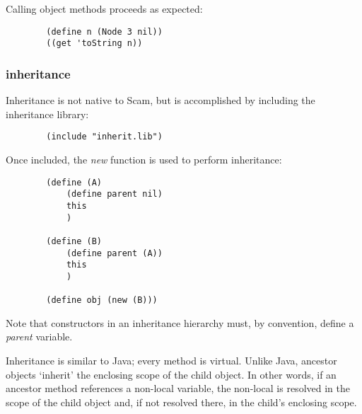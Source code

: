\documentclass{article}
\begin{document}
    Calling object methods proceeds as expected:

\begin{verbatim}
        (define n (Node 3 nil))
        ((get 'toString n))
\end{verbatim}


\subsubsection*{inheritance}

    Inheritance is not native to Scam, but is accomplished by 
    including the inheritance library:
    
\begin{verbatim}
        (include "inherit.lib")
\end{verbatim}

     Once included, the {\it new} function is used to perform
     inheritance:

\begin{verbatim}
        (define (A)
            (define parent nil)
            this
            )

        (define (B)
            (define parent (A))
            this
            )
    
        (define obj (new (B)))
\end{verbatim}

    Note that constructors in an inheritance hierarchy must, by
    convention, define a {\it parent} variable.

    Inheritance is similar to Java; every method is virtual.
    Unlike Java, ancestor objects `inherit' the enclosing scope
    of the child object. In other words, if an ancestor method
    references a non-local variable, the non-local is resolved
    in the scope of the child object and, if not resolved there,
    in the child's enclosing scope.
\end{document}
